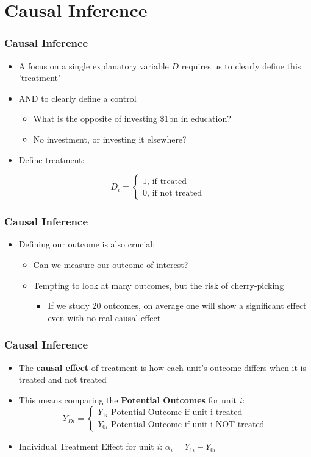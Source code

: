 \documentclass[xcolor=x11names,compress]{beamer}\usepackage[]{graphicx}\usepackage[]{xcolor}
\renewcommand{\(}{\begin{columns}}
\renewcommand{\)}{\end{columns}}
\newcommand{\<}[1]{\begin{column}{#1}}
\renewcommand{\>}{\end{column}}
\begin{document}
\section{Causal Inference}

\begin{frame}
\frametitle{Causal Inference}
\begin{itemize}
\item A focus on a single explanatory variable $D$ requires us to clearly define this 'treatment' 
\pause
\item AND to clearly define a control
\pause
\begin{itemize}
\item What is the opposite of investing \$1bn in education?
\pause
\item No investment, or investing it elsewhere?
\pause
\end{itemize}
\item Define treatment:
\end{itemize}
\[D_i = 
\begin{cases}
1 \text{, if treated} \\
0 \text{, if not treated}
\end{cases}
\]
\end{frame}

\begin{frame}
\frametitle{Causal Inference}
\begin{itemize}
\item Defining our outcome is also crucial:
\pause
\begin{itemize}
\item Can we measure our outcome of interest?
\pause
\item Tempting to look at many outcomes, but the risk of cherry-picking
\pause
\begin{itemize}
\item If we study 20 outcomes, on average one will show a significant effect even with no real causal effect
\end{itemize}
\end{itemize}
\end{itemize}
\end{frame}

\begin{frame}
\frametitle{Causal Inference}
\begin{itemize}
\item The \textbf{causal effect} of treatment is how each unit's outcome differs when it is treated and not treated
\pause
\item This means comparing the \textbf{Potential Outcomes} for unit $i$:
\[
Y_{Di} = 
\begin{cases}
Y_{1i}\text{   Potential Outcome if unit i treated} \\
Y_{0i}\text{   Potential Outcome if unit i NOT treated}
\end{cases}
\]
\pause
\item Individual Treatment Effect for unit $i$: $\alpha_i = Y_{1i} - Y_{0i}$
\end{itemize}
\end{frame}
\end{document}
